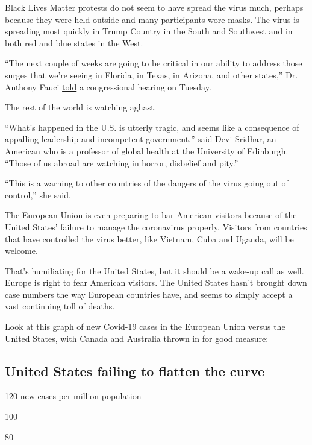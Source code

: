 Black Lives Matter protests do not seem to have spread the virus much,
perhaps because they were held outside and many participants wore masks.
The virus is spreading most quickly in Trump Country in the South and
Southwest and in both red and blue states in the West.

``The next couple of weeks are going to be critical in our ability to
address those surges that we're seeing in Florida, in Texas, in Arizona,
and other states,'' Dr. Anthony Fauci
\href{https://www.nytimes.com/2020/06/23/us/politics/fauci-congress-coronavirus.html}{told}
a congressional hearing on Tuesday.

The rest of the world is watching aghast.

``What's happened in the U.S. is utterly tragic, and seems like a
consequence of appalling leadership and incompetent government,'' said
Devi Sridhar, an American who is a professor of global health at the
University of Edinburgh. ``Those of us abroad are watching in horror,
disbelief and pity.''

``This is a warning to other countries of the dangers of the virus going
out of control,'' she said.

The European Union is even
\href{https://www.nytimes.com/2020/06/23/world/europe/coronavirus-EU-American-travel-ban.html}{preparing
to bar} American visitors because of the United States' failure to
manage the coronavirus properly. Visitors from countries that have
controlled the virus better, like Vietnam, Cuba and Uganda, will be
welcome.

That's humiliating for the United States, but it should be a wake-up
call as well. Europe is right to fear American visitors. The United
States hasn't brought down case numbers the way European countries have,
and seems to simply accept a vast continuing toll of deaths.

Look at this graph of new Covid-19 cases in the European Union versus
the United States, with Canada and Australia thrown in for good measure:

\hypertarget{united-states-failing-to-flatten-the-curve}{%
\subsection{United States failing to flatten the
curve}\label{united-states-failing-to-flatten-the-curve}}

120 new cases per million population

100

80


